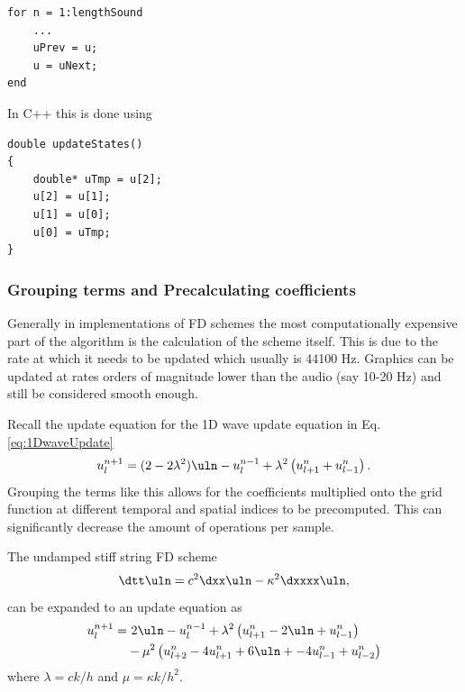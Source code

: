\setlstMAT
\begin{lstlisting}
for n = 1:lengthSound
    ...
    uPrev = u;
    u = uNext;
end
\end{lstlisting}



In C++ this is done using
\setlstCpp
\begin{lstlisting}[caption=Implementation of a pointer switch also shown in Figure \ref{fig:pointerSwitch}. A temporary pointer is assigned to where the $\u^{n-1}$ pointer is currently pointing at to be able to assign that location in memory to the $\u^{n+1}$ pointer in the end., label=lst:cppPointer]
double updateStates()
{
    double* uTmp = u[2];
    u[2] = u[1];
    u[1] = u[0];
    u[0] = uTmp;
}
\end{lstlisting}

\pagebreak
\subsubsection{Grouping terms and Precalculating coefficients}
Generally in implementations of FD schemes the most computationally expensive part of the algorithm is the calculation of the scheme itself. This is due to the rate at which it needs to be updated which usually is 44100 Hz. Graphics can be updated at rates orders of magnitude lower than the audio (say 10-20 Hz) and still be considered smooth enough.

Recall the update equation for the 1D wave update equation in Eq. \eqref{eq:1DwaveUpdate}
\begin{equation*}
    u_l^{n+1} = (2 - 2 \lambda^2) \uln - u_l^{n-1} + \lambda^2\left(u_{l+1}^n + u_{l-1}^n\right).
\end{equation*}
Grouping the terms like this allows for the coefficients multiplied onto the grid function at different temporal and spatial indices to be precomputed. This can significantly decrease the amount of operations per sample.

The undamped stiff string FD scheme%
\begin{equation}
    \dtt \uln = c^2 \dxx \uln - \kappa^2 \dxxxx \uln,
\end{equation}
can be expanded to an update equation as
\begin{equation}
    \begin{aligned}
        u_l^{n+1} = &\ 2\uln - u_l^{n-1} + \lambda^2 \left(u_{l+1}^n - 2\uln + u_{l-1}^n\right)\\
        & - \mu^2 \left(u_{l+2}^n - 4u_{l+1}^n + 6\uln + -4u_{l-1}^n + u_{l-2}^n\right)
    \end{aligned}
\end{equation}
where $\lambda = ck/h$ and $\mu = \kappa k / h^2$.

